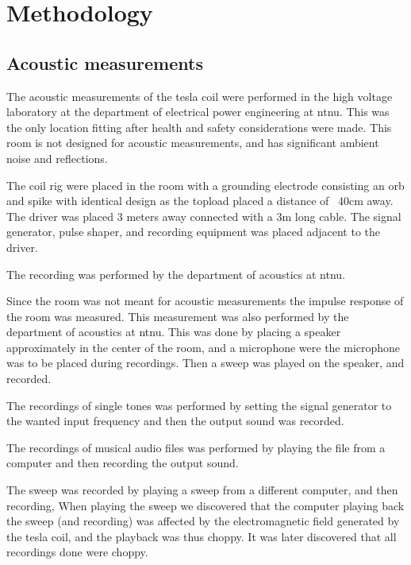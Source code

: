 \chapter{Methodology}

\section{Acoustic measurements}

The acoustic measurements of the tesla coil were performed in the high voltage laboratory at the department of electrical power engineering at ntnu. This was the only location fitting after health and safety considerations were made. This room is not designed for acoustic measurements, and has significant ambient noise and reflections.

The coil rig were placed in the room with a grounding electrode consisting an orb and spike with identical design as the topload placed a distance of ~40cm away. The driver was placed 3 meters away connected with a 3m long cable. The signal generator, pulse shaper, and recording equipment was placed adjacent to the driver.

The recording was performed by the department of acoustics at ntnu.

Since the room was not meant for acoustic measurements the impulse response of the room was measured. This measurement was also performed by the department of acoustics at ntnu. This was done by placing a speaker approximately in the center of the room, and a microphone were the microphone was to be placed during recordings. Then a sweep was played on the speaker, and recorded.

The recordings of single tones was performed by setting the signal generator to the wanted input frequency and then the output sound was recorded.

The recordings of musical audio files was performed by playing the file from a computer and then recording the output sound.

The sweep was recorded by playing a sweep from a different computer, and then recording, When playing the sweep we discovered that the computer playing back the sweep (and recording) was affected by the electromagnetic field generated by the tesla coil, and the playback was thus choppy. It was later discovered that all recordings done were choppy.






